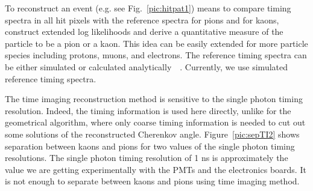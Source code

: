 \documentclass[11pt, a4paper]{article}
\begin{document}
To reconstruct an event (e.g. see Fig.~\ref{pic:hitpat1}) means to compare timing spectra in all hit pixels with the reference spectra for pions and for kaons, construct extended log likelihoods and derive a quantitative measure of the particle to be a pion or a kaon. This idea can be easily extended for more particle species including protons, muons, and electrons. The reference timing spectra can be either simulated or calculated analytically~\cite{staric2}~\cite{staric3}. Currently, we use simulated reference timing spectra.

The time imaging reconstruction method is sensitive to the single photon timing resolution. Indeed, the timing information is used here directly, unlike for the geometrical algorithm, where only coarse timing information is needed to cut out some solutions of the reconstructed Cherenkov angle. Figure~\ref{pic:sepTI2} shows separation between kaons and pions for two values of the single photon timing resolutions. The single photon timing resolution of 1 ns is approximately the value we are getting experimentally with the PMTs and the electronics boards. It is not enough to separate between kaons and pions using time imaging method.
\end{document}
